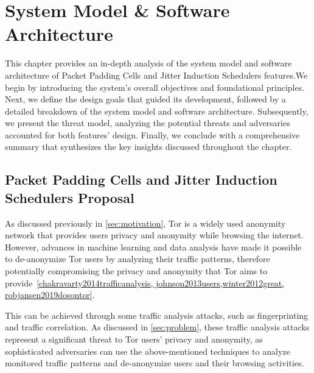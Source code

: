 
%

\makeatletter
\newcommand{\ntifpkgloaded}{%
  \@ifpackageloaded%
}
\makeatother


\chapter{System Model \& Software Architecture}\label{cha:system_model}

This chapter provides an in-depth analysis of the system model and software architecture of Packet Padding Cells and Jitter Induction Schedulers features.\@ We begin by introducing the system's overall objectives and foundational principles. Next, we define the design goals that guided its development, followed by a detailed breakdown of the system model and software architecture. Subsequently, we present the threat model, analyzing the potential threats and adversaries accounted for both features' design. Finally, we conclude with a comprehensive summary that synthesizes the key insights discussed throughout the chapter.

\section{Packet Padding Cells and Jitter Induction Schedulers Proposal}\label{sec:system_propostal}

As discussed previously in \autoref{sec:motivation}, Tor is a widely used anonymity network that provides users privacy and anonymity while browsing the internet. However, advances in machine learning and data analysis have made it possible to de-anonymize Tor users by analyzing their traffic patterns, therefore potentially  compromising the privacy and anonymity that Tor aims to provide~\ref{chakravarty2014trafficanalysis, johnson2013users,winter2012great, robjansen2019dosontor}. 

This can be achieved through some traffic analysis attacks, such as fingerprinting and traffic correlation. As discussed in \autoref{sec:problem}, these traffic analysis attacks represent a significant threat to Tor users' privacy and anonymity, as sophisticated adversaries can use the above-mentioned techniques to analyze monitored traffic patterns and de-anonymize users and their browsing activities.

